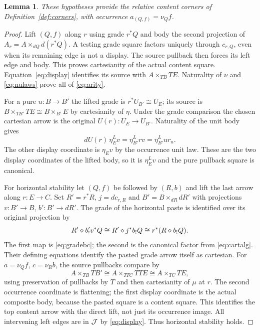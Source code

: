 \documentclass[11pt]{article}
\numberwithin{equation}{section}
\newtheorem{lemma}[theorem]{Lemma}
\theoremstyle{definition}\newtheorem{definition}[theorem]{Definition}
\begin{document}
\begin{lemma}\label{lem:comma}
These hypotheses provide the relative content corners of
Definition~\ref{def:corners}, with occurrence $a_{(Q,f)}=\nu_Q f$.
\end{lemma}
\begin{proof}
Lift $(Q,f)$ along $r$ using grade $r^*Q$ and body the second projection
of $A_r=A\times_{dQ}d(r^*Q)$. A testing grade square factors uniquely
through $c_{r,Q}$, even when its remaining edge is not a display.
The source pullback then forces its left edge and body. This proves
cartesianity of the actual content square. Equation~\eqref{eq:display}
identifies its source with $A\times_{TB}TE$. Naturality of $\nu$ and
\eqref{eq:nulaws} prove all of \eqref{eq:arity}.

For a pure $u:B\to B'$ the lifted grade is $r^*U_{B'}\cong U_E$;
its source is $B\times_{TB'}TE\cong B\times_{B'}E$ by cartesianity
of $\eta$. Under the grade comparison the chosen cartesian arrow is
the original $U(r):U_E\to U_{B'}$. Naturality of the unit body gives
\[
 dU(r)\,\eta^L_Ev=\eta^L_{B'}rv=\eta^L_{B'}u r_u .
\]
The other display coordinate is $\eta_Ev$ by the occurrence unit law.
These are the two display coordinates of the lifted body, so it is
$\eta^L_Ev$ and the pure pullback square is canonical.

For horizontal stability let $(Q,f)$ be followed by $(R,b)$ and lift the
last arrow along $r:E\to C$. Set $R'=r^*R$, $j=dc_{r,R}$ and
$B'=B\times_{dR}dR'$ with projections $v:B'\to B$, $b':B'\to dR'$.
The grade of the horizontal paste is identified over its original
projection by
\[
 R'\mathbin{\diamond} b'_!v^*Q\cong R'\mathbin{\diamond} j^*b_!Q
                    \cong r^*(R\mathbin{\diamond} b_!Q).
\]
The first map is \eqref{eq:gradebc}; the second is the canonical factor
from \eqref{eq:cartalg}. Their defining equations identify the pasted
grade arrow itself as cartesian. For $a=\nu_Q f$, $c=\nu_Rb$, the
source pullbacks compare by
\[
 A\times_{TB}TB'\cong A\times_{TTC}TTE
                          \cong A\times_{TC}TE,
\]
using preservation of pullbacks by $T$ and then cartesianity of $\mu$
at $r$. The second occurrence coordinate is flattening; the first display
coordinate is the actual composite body, because the pasted square is a
content square. This identifies the top content arrow with the direct
lift, not just its occurrence image. All intervening left edges are in
$\mathcal J$ by \eqref{eq:display}. Thus horizontal stability holds.
\end{proof}
\end{document}
